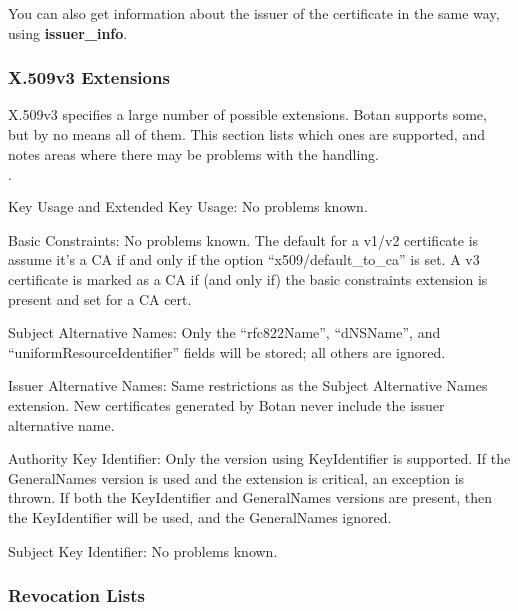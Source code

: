 \documentclass{article}
\newcommand{\function}[1]{\textbf{#1}}
\begin{document}
You can also get information about the issuer of the certificate in the same
way, using \function{issuer\_info}.

\subsubsection{X.509v3 Extensions}

X.509v3 specifies a large number of possible extensions. Botan
supports some, but by no means all of them. This section lists which
ones are supported, and notes areas where there may be problems with
the handling.

\begin{list}{$\cdot$}
  \item Key Usage and Extended Key Usage: No problems known.
  \item

  \item Basic Constraints: No problems known. The default for a v1/v2
        certificate is assume it's a CA if and only if the option
        ``x509/default\_to\_ca'' is set. A v3 certificate is marked as a CA if
        (and only if) the basic constraints extension is present and set for a
        CA cert.

  \item Subject Alternative Names: Only the ``rfc822Name'', ``dNSName'', and
        ``uniformResourceIdentifier'' fields will be stored; all others are
        ignored.

  \item Issuer Alternative Names: Same restrictions as the Subject Alternative
        Names extension. New certificates generated by Botan never include the
        issuer alternative name.

  \item Authority Key Identifier: Only the version using KeyIdentifier is
        supported. If the GeneralNames version is used and the extension is
        critical, an exception is thrown. If both the KeyIdentifier and
        GeneralNames versions are present, then the KeyIdentifier will be
        used, and the GeneralNames ignored.

  \item Subject Key Identifier: No problems known.
\end{list}

\subsubsection{Revocation Lists}
\end{document}
